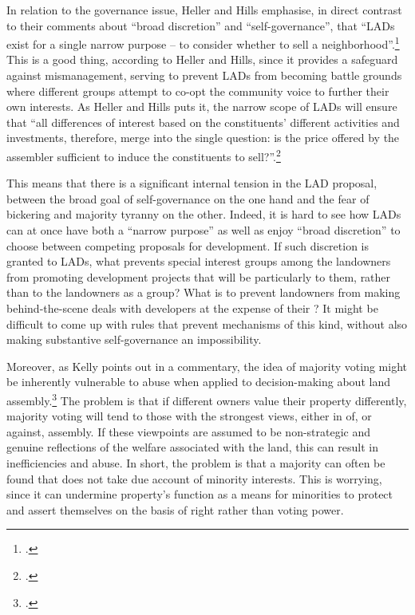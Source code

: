 In relation to the governance issue, Heller and Hills emphasise, in direct contrast to their comments about ``broad discretion'' and ``self-governance'', that ``LADs exist for a single narrow purpose -- to consider whether to sell a neighborhood''.\footcite[See][1500]{heller08} This is a good thing, according to Heller and Hills, since it provides a safeguard against mismanagement, serving to prevent LADs from becoming battle grounds where different groups attempt to co-opt the community voice to further their own interests. As Heller and Hills puts it, the narrow scope of LADs will ensure that ``all differences of interest based on the constituents' different activities and investments, therefore, merge into the single question: is the price offered by the assembler sufficient to induce the constituents to sell?''.\footcite[1500]{heller08}

This means that there is a significant internal tension in the LAD proposal, between the broad goal of self-governance on the one hand and the fear of  bickering and majority tyranny on the other. Indeed, it is hard to see how LADs can at once have both a ``narrow purpose'' as well as enjoy ``broad discretion'' to choose between competing proposals for development. If such discretion is granted to LADs, what prevents special interest groups among the landowners from promoting development projects that will be particularly  to them, rather than to the landowners as a group? What is to prevent landowners from making behind-the-scene deals with  developers at the expense of their ? It might be difficult to come up with rules that prevent mechanisms of this kind, without also making substantive self-governance an impossibility.

Moreover, as Kelly points out in a commentary, the idea of majority voting might be inherently vulnerable to abuse when applied to  decision-making about land assembly.\footcite{kelly09} The problem is that if different owners value their property differently, majority voting will tend to  those with the strongest views, either in  of, or against, assembly. If these viewpoints are assumed to be non-strategic and genuine reflections of the welfare associated with the land, this can result in inefficiencies and abuse. In short, the problem is that a majority can often be found that does not take due account of minority interests. This is worrying, since it can undermine property's function as a means for minorities to protect and assert themselves on the basis of right rather than voting power.

